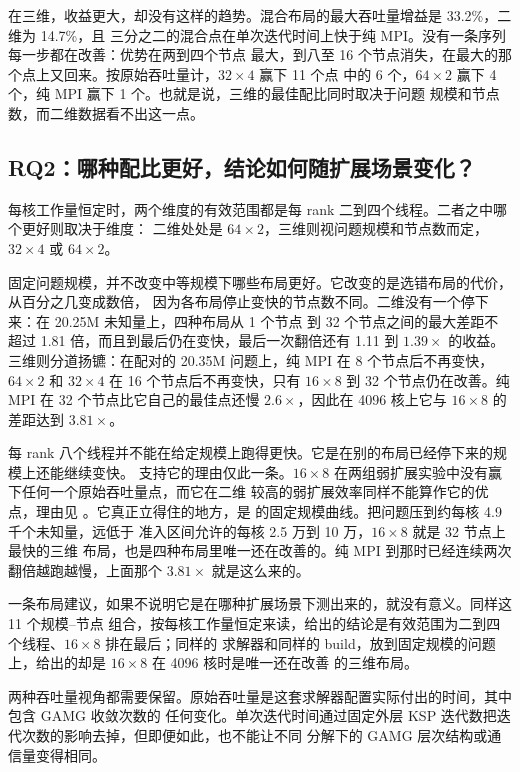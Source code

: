 \documentclass[11pt,a4paper,oneside]{report}
\let\OldSubsection\subsection
\renewcommand{\subsection}{\FloatBarrier\OldSubsection}
\begin{document}
在三维，收益更大，却没有这样的趋势。混合布局的最大吞吐量增益是 33.2\%，二维为 14.7\%，且
三分之二的混合点在单次迭代时间上快于纯 MPI。没有一条序列每一步都在改善：优势在两到四个节点
最大，到八至 16 个节点消失，在最大的那个点上又回来。按原始吞吐量计，$32\times4$ 赢下 11 个点
中的 6 个，$64\times2$ 赢下 4 个，纯 MPI 赢下 1 个。也就是说，三维的最佳配比同时取决于问题
规模和节点数，而二维数据看不出这一点。

\subsection{RQ2：哪种配比更好，结论如何随扩展场景变化？}
\label{sec:rq2}
每核工作量恒定时，两个维度的有效范围都是每 rank 二到四个线程。二者之中哪个更好则取决于维度：
二维处处是 $64\times2$，三维则视问题规模和节点数而定，$32\times4$ 或 $64\times2$。

固定问题规模，并不改变中等规模下哪些布局更好。它改变的是选错布局的代价，从百分之几变成数倍，
因为各布局停止变快的节点数不同。二维没有一个停下来：在 20.25M 未知量上，四种布局从 1 个节点
到 32 个节点之间的最大差距不超过 1.81 倍，而且到最后仍在变快，最后一次翻倍还有 1.11 到
$1.39\times$ 的收益。三维则分道扬镳：在配对的 20.35M 问题上，纯 MPI 在 8 个节点后不再变快，
$64\times2$ 和 $32\times4$ 在 16 个节点后不再变快，只有 $16\times8$ 到 32 个节点仍在改善。纯
MPI 在 32 个节点比它自己的最佳点还慢 $2.6\times$，因此在 4096 核上它与 $16\times8$ 的差距达到
$3.81\times$。

每 rank 八个线程并不能在给定规模上跑得更快。它是在别的布局已经停下来的规模上还能继续变快。
支持它的理由仅此一条。$16\times8$ 在两组弱扩展实验中没有赢下任何一个原始吞吐量点，而它在二维
较高的弱扩展效率同样不能算作它的优点，理由见 。它真正立得住的地方，是
 的固定规模曲线。把问题压到约每核 4.9 千个未知量，远低于
 准入区间允许的每核 2.5 万到 10 万，$16\times8$ 就是 32 节点上最快的三维
布局，也是四种布局里唯一还在改善的。纯 MPI 到那时已经连续两次翻倍越跑越慢，上面那个
$3.81\times$ 就是这么来的。

一条布局建议，如果不说明它是在哪种扩展场景下测出来的，就没有意义。同样这 11 个规模--节点
组合，按每核工作量恒定来读，给出的结论是有效范围为二到四个线程、$16\times8$ 排在最后；同样的
求解器和同样的 build，放到固定规模的问题上，给出的却是 $16\times8$ 在 4096 核时是唯一还在改善
的三维布局。

两种吞吐量视角都需要保留。原始吞吐量是这套求解器配置实际付出的时间，其中包含 GAMG 收敛次数的
任何变化。单次迭代时间通过固定外层 KSP 迭代数把迭代次数的影响去掉，但即便如此，也不能让不同
分解下的 GAMG 层次结构或通信量变得相同。
\end{document}
